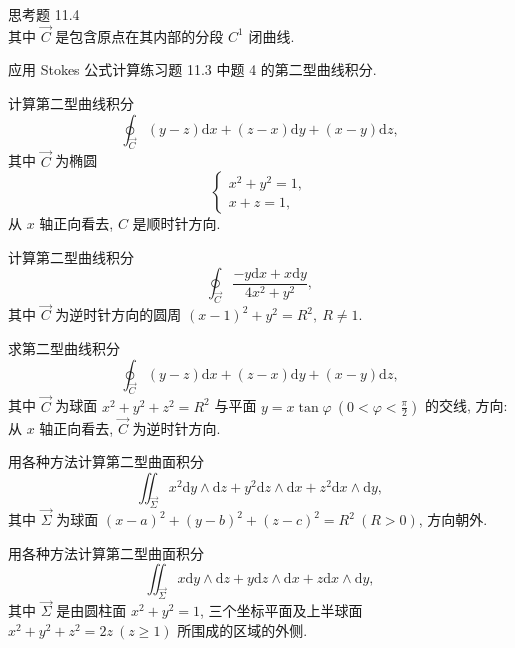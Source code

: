 \begin{exblock}{思考题 11.4}
\[  \]
  其中 $\overrightarrow{C}$ 是包含原点在其内部的分段 $C^{1}$ 闭曲线.
\item 应用 Stokes 公式计算练习题 11.3 中题 4 的第二型曲线积分.
\item 计算第二型曲线积分
  \[
  \oint_{\overrightarrow{C}}(y-z)\mathrm{d}x+(z-x)\mathrm{d}y+(x-y)\mathrm{d}z,
  \]
  其中 $\overrightarrow{C}$ 为椭圆
  \[
  \begin{cases}
  x^{2}+y^{2}=1,\\
  x+z=1,
  \end{cases}
  \]
  从 $x$ 轴正向看去, $C$ 是顺时针方向.
\item 计算第二型曲线积分
  \[
  \oint_{\overrightarrow{C}}\frac{-y\mathrm{d}x+x\mathrm{d}y}{4x^{2}+y^{2}},
  \]
  其中 $\overrightarrow{C}$ 为逆时针方向的圆周 $(x-1)^{2}+y^{2}=R^{2},\ R\neq1$.
\item 求第二型曲线积分
  \[
  \oint_{\overrightarrow{C}}(y-z)\mathrm{d}x+(z-x)\mathrm{d}y+(x-y)\mathrm{d}z,
  \]
  其中 $\overrightarrow{C}$ 为球面 $x^{2}+y^{2}+z^{2}=R^{2}$ 与平面 $y=x\tan\varphi\ \left(0<\varphi<\frac{\pi}{2}\right)$ 的交线, 方向: 从 $x$ 轴正向看去, $\overrightarrow{C}$ 为逆时针方向.
\item 用各种方法计算第二型曲面积分
  \[
  \iint_{\overrightarrow{\Sigma}}x^{2}\mathrm{d}y\wedge\mathrm{d}z+y^{2}\mathrm{d}z\wedge\mathrm{d}x+z^{2}\mathrm{d}x\wedge\mathrm{d}y,
  \]
  其中 $\overrightarrow{\Sigma}$ 为球面 $(x-a)^{2}+(y-b)^{2}+(z-c)^{2}=R^{2}\ (R>0)$, 方向朝外.
\item 用各种方法计算第二型曲面积分
  \[
  \iint_{\overrightarrow{\Sigma}}x\mathrm{d}y\wedge\mathrm{d}z+y\mathrm{d}z\wedge\mathrm{d}x+z\mathrm{d}x\wedge\mathrm{d}y,
  \]
  其中 $\overrightarrow{\Sigma}$ 是由圆柱面 $x^{2}+y^{2}=1$, 三个坐标平面及上半球面 $x^{2}+y^{2}+z^{2}=2z\ (z\geqslant1)$ 所围成的区域的外侧.
\end{exblock}
